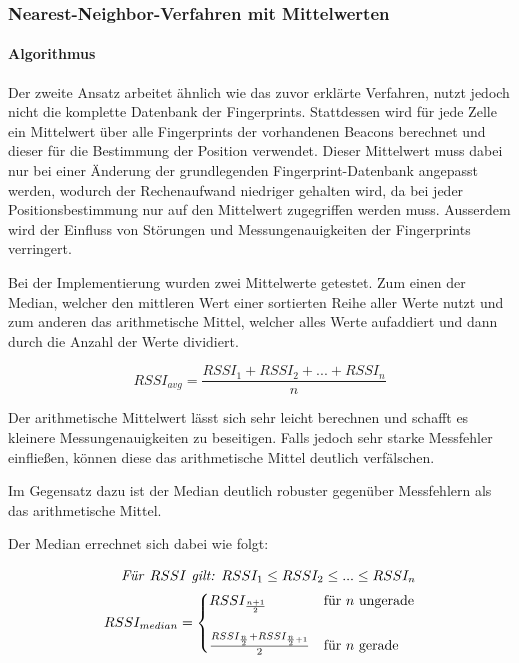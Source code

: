 \subsubsection{Nearest-Neighbor-Verfahren mit Mittelwerten}
\label{sec:implementation:fingerprinting:positioning:avg}

\paragraph{Algorithmus}
\label{sec:implementation:fingerprinting:positioning:avg:algorithm}

Der zweite Ansatz arbeitet ähnlich wie das zuvor erklärte Verfahren, nutzt jedoch nicht die komplette Datenbank der Fingerprints. 
Stattdessen wird für jede Zelle ein Mittelwert über alle Fingerprints der vorhandenen Beacons berechnet und dieser für die Bestimmung der Position verwendet.
Dieser Mittelwert muss dabei nur bei einer Änderung der grundlegenden Fingerprint-Datenbank angepasst werden, wodurch der Rechenaufwand niedriger gehalten wird, da bei jeder Positionsbestimmung nur auf den Mittelwert zugegriffen werden muss.
Ausserdem wird der Einfluss von Störungen und Messungenauigkeiten der Fingerprints verringert.

Bei der Implementierung wurden zwei Mittelwerte getestet. Zum einen der Median, welcher den mittleren Wert einer sortierten Reihe aller Werte nutzt und zum anderen das arithmetische Mittel, welcher alles Werte aufaddiert und dann durch die Anzahl der Werte dividiert.

\begin{equation}
	RSSI_{avg} = \frac{RSSI_{1} + RSSI_{2} + ... + RSSI_{n}}{n}
\end{equation}

Der arithmetische Mittelwert lässt sich sehr leicht berechnen und schafft es kleinere Messungenauigkeiten zu beseitigen. Falls jedoch sehr starke Messfehler einfließen, können diese das arithmetische Mittel deutlich verfälschen.

Im Gegensatz dazu ist der Median deutlich robuster gegenüber Messfehlern als das arithmetische Mittel.

Der Median errechnet sich dabei wie folgt: 

\begin{equation}
	\begin{split}
	\text{\emph{Für }}RSSI \text{\emph{ gilt: }} RSSI_{1} \leq RSSI_{2} \leq ... \leq RSSI_{n} \\
	RSSI_{median}=\begin{cases}
	RSSI_{\frac{n+1}{2}} & \text{für } n \text{ ungerade}\\ \\
	\frac{RSSI_{\frac{n}{2}} + RSSI_{\frac{n}{2}+1}}{2} & \text{für } n \text{ gerade} \\
	\end{cases}
	\end{split}
\end{equation}

